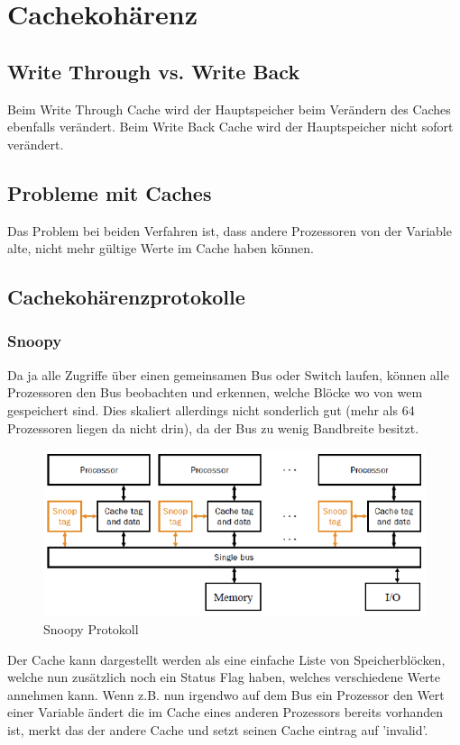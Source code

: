 \section{Cachekohärenz}

\subsection{Write Through vs. Write Back}
Beim Write Through Cache wird der Hauptspeicher beim Verändern des Caches ebenfalls verändert. Beim Write Back Cache wird der Hauptspeicher nicht sofort verändert.
 
\subsection{Probleme mit Caches}
Das Problem bei beiden Verfahren ist, dass andere Prozessoren von der Variable alte, nicht mehr gültige Werte im Cache haben können.

\subsection{Cachekohärenzprotokolle}

\subsubsection{Snoopy}
Da ja alle Zugriffe über einen gemeinsamen Bus oder Switch laufen, können alle Prozessoren den Bus beobachten und erkennen, welche Blöcke wo von wem gespeichert sind. Dies skaliert allerdings nicht sonderlich gut (mehr als 64 Prozessoren liegen da nicht drin), da der Bus zu wenig Bandbreite besitzt.

\begin{figure}[h!]
\centering
\includegraphics[width=0.5\linewidth]{fig/snoopy}
\caption{Snoopy Protokoll}
\label{fig:snoopy}
\end{figure}

Der Cache kann dargestellt werden als eine einfache Liste von Speicherblöcken, welche nun zusätzlich noch ein Status Flag haben, welches verschiedene Werte annehmen kann. Wenn z.B. nun irgendwo auf dem Bus ein Prozessor den Wert einer Variable ändert die im Cache eines anderen Prozessors bereits vorhanden ist, merkt das der andere Cache und setzt seinen Cache eintrag auf 'invalid'.

